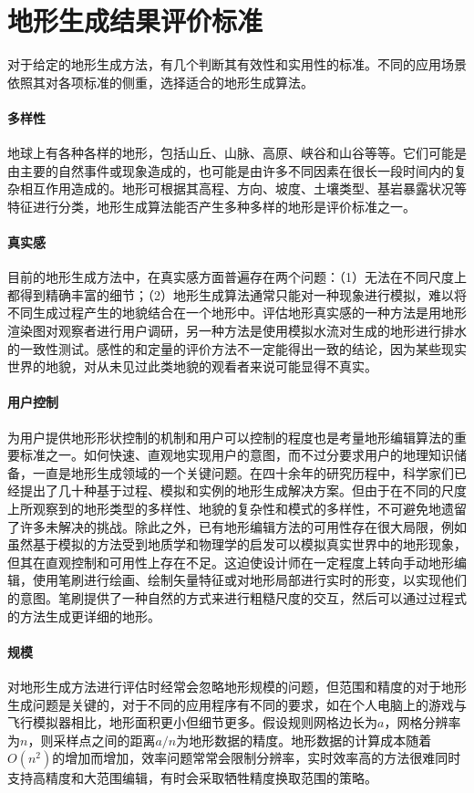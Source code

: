 \section{地形生成结果评价标准}
对于给定的地形生成方法，有几个判断其有效性和实用性的标准。不同的应用场景依照其对各项标准的侧重，选择适合的地形生成算法。\supercite{eric-review}
\paragraph{多样性}
地球上有各种各样的地形，包括山丘、山脉、高原、峡谷和山谷等等。它们可能是由主要的自然事件或现象造成的，也可能是由许多不同因素在很长一段时间内的复杂相互作用造成的。地形可根据其高程、方向、坡度、土壤类型、基岩暴露状况等特征进行分类，地形生成算法能否产生多种多样的地形是评价标准之一。
\paragraph{真实感}
目前的地形生成方法中，在真实感方面普遍存在两个问题：（1）无法在不同尺度上都得到精确丰富的细节；（2）地形生成算法通常只能对一种现象进行模拟，难以将不同生成过程产生的地貌结合在一个地形中。评估地形真实感的一种方法是用地形渲染图对观察者进行用户调研，另一种方法是使用模拟水流对生成的地形进行排水的一致性测试。感性的和定量的评价方法不一定能得出一致的结论，因为某些现实世界的地貌，对从未见过此类地貌的观看者来说可能显得不真实。
\paragraph{用户控制}
为用户提供地形形状控制的机制和用户可以控制的程度也是考量地形编辑算法的重要标准之一。如何快速、直观地实现用户的意图，而不过分要求用户的地理知识储备，一直是地形生成领域的一个关键问题。在四十余年的研究历程中，科学家们已经提出了几十种基于过程、模拟和实例的地形生成解决方案。但由于在不同的尺度上所观察到的地形类型的多样性、地貌的复杂性和模式的多样性，不可避免地遗留了许多未解决的挑战。除此之外，已有地形编辑方法的可用性存在很大局限，例如虽然基于模拟的方法受到地质学和物理学的启发可以模拟真实世界中的地形现象，但其在直观控制和可用性上存在不足。这迫使设计师在一定程度上转向手动地形编辑，使用笔刷进行绘画、绘制矢量特征或对地形局部进行实时的形变，以实现他们的意图。笔刷提供了一种自然的方式来进行粗糙尺度的交互，然后可以通过过程式的方法生成更详细的地形。
\paragraph{规模}
对地形生成方法进行评估时经常会忽略地形规模的问题，但范围和精度的对于地形生成问题是关键的，对于不同的应用程序有不同的要求，如在个人电脑上的游戏与飞行模拟器相比，地形面积更小但细节更多。假设规则网格边长为$a$，网格分辨率为$n$，则采样点之间的距离$a/n$为地形数据的精度。地形数据的计算成本随着$O(n^2)$的增加而增加，效率问题常常会限制分辨率，实时效率高的方法很难同时支持高精度和大范围编辑，有时会采取牺牲精度换取范围的策略。
